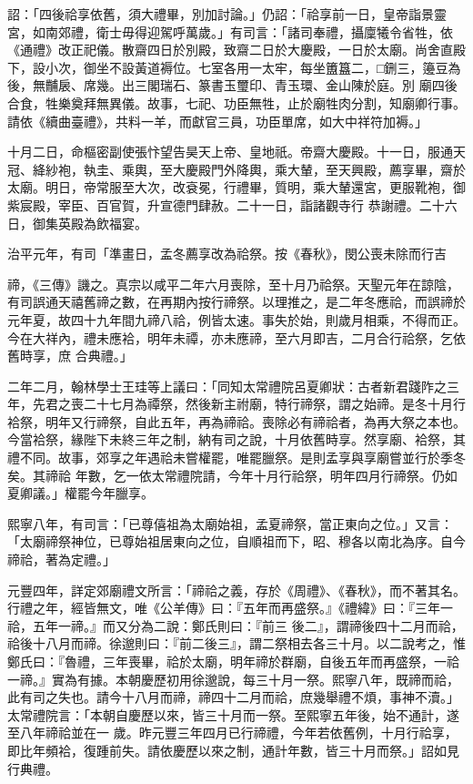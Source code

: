 \begin{pinyinscope}
 詔：「四後祫享依舊，須大禮畢，別加討論。」仍詔：「祫享前一日，皇帝詣景靈宮，如南郊禮，衛士毋得迎駕呼萬歲。」有司言：「諸司奉禮，攝廩犧令省牲，依《通禮》改正祀儀。散齋四日於別殿，致齋二日於大慶殿，一日於太廟。尚舍直殿下，設小次，御坐不設黃道褥位。七室各用一太牢，每坐簠簋二，□鉶三，籩豆為後，無黼扆、席幾。出三閣瑞石、篆書玉璽印、青玉環、金山陳於庭。別
 廟四後合食，牲樂奠拜無異儀。故事，七祀、功臣無牲，止於廟牲肉分割，知廟卿行事。請依《續曲臺禮》，共料一羊，而獻官三員，功臣單席，如大中祥符加褥。」



 十月二日，命樞密副使張忭望告昊天上帝、皇地祇。帝齋大慶殿。十一日，服通天冠、絳紗袍，執圭、乘輿，至大慶殿門外降輿，乘大輦，至天興殿，薦享畢，齋於太廟。明日，帝常服至大次，改袞冕，行禮畢，質明，乘大輦還宮，更服靴袍，御紫宸殿，宰臣、百官賀，升宣德門肆赦。二十一日，詣諸觀寺行
 恭謝禮。二十六日，御集英殿為飲福宴。



 治平元年，有司「準畫日，孟冬薦享改為祫祭。按《春秋》，閔公喪未除而行吉



 禘，《三傳》譏之。真宗以咸平二年六月喪除，至十月乃祫祭。天聖元年在諒陰，有司誤通天禧舊禘之數，在再期內按行禘祭。以理推之，是二年冬應祫，而誤禘於元年夏，故四十九年間九禘八祫，例皆太速。事失於始，則歲月相乘，不得而正。今在大祥內，禮未應袷，明年未禫，亦未應禘，至六月即吉，二月合行祫祭，乞依舊時享，庶
 合典禮。」



 二年二月，翰林學士王珪等上議曰：「同知太常禮院呂夏卿狀：古者新君踐阼之三年，先君之喪二十七月為禫祭，然後新主祔廟，特行禘祭，謂之始禘。是冬十月行袷祭，明年又行禘祭，自此五年，再為禘祫。喪除必有禘祫者，為再大祭之本也。今當袷祭，緣陛下未終三年之制，納有司之說，十月依舊時享。然享廟、袷祭，其禮不同。故事，郊享之年遇祫未嘗權罷，唯罷臘祭。是則孟享與享廟嘗並行於季冬矣。其禘祫
 年數，乞一依太常禮院請，今年十月行祫祭，明年四月行禘祭。仍如夏卿議。」權罷今年臘享。



 熙寧八年，有司言：「已尊僖祖為太廟始祖，孟夏禘祭，當正東向之位。」又言：「太廟禘祭神位，已尊始祖居東向之位，自順祖而下，昭、穆各以南北為序。自今禘祫，著為定禮。」



 元豐四年，詳定郊廟禮文所言：「禘祫之義，存於《周禮》、《春秋》，而不著其名。行禮之年，經皆無文，唯《公羊傳》曰：『五年而再盛祭。』《禮緯》曰：『三年一祫，五年一禘。』而又分為二說：鄭氏則曰：『前三
 後二』，謂禘後四十二月而祫，祫後十八月而禘。徐邈則曰：『前二後三』，謂二祭相去各三十月。以二說考之，惟鄭氏曰：『魯禮，三年喪畢，祫於太廟，明年禘於群廟，自後五年而再盛祭，一祫一禘。』實為有據。本朝慶歷初用徐邈說，每三十月一祭。熙寧八年，既禘而祫，此有司之失也。請今十八月而禘，禘四十二月而祫，庶幾舉禮不煩，事神不瀆。」太常禮院言：「本朝自慶歷以來，皆三十月而一祭。至熙寧五年後，始不通計，遂至八年禘祫並在一
 歲。昨元豐三年四月已行禘禮，今年若依舊例，十月行祫享，即比年頻袷，復踵前失。請依慶歷以來之制，通計年數，皆三十月而祭。」詔如見行典禮。




\end{pinyinscope}
